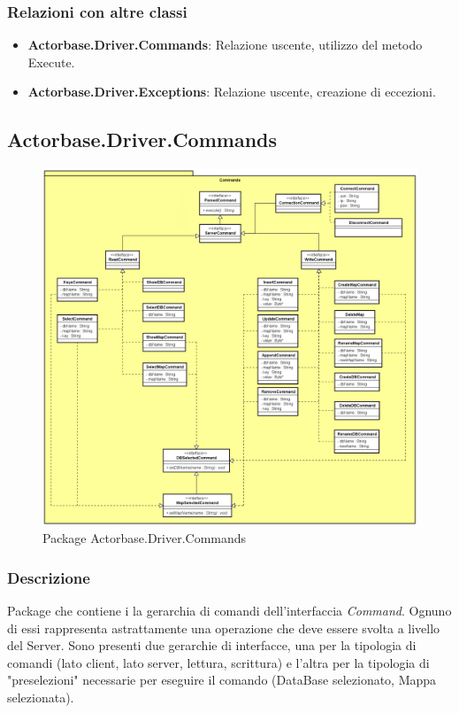 \documentclass[a4paper]{article}
\begin{document}
		\subsubsection{Relazioni con altre classi}
		\begin{itemize}
			\item \textbf{Actorbase.Driver.Commands}: Relazione uscente, utilizzo del metodo Execute.
			\item \textbf{Actorbase.Driver.Exceptions}: Relazione uscente, creazione di eccezioni.
		\end{itemize}
		
		
	\subsection{Actorbase.Driver.Commands}
		\begin{figure} [H]
			\centering
			\includegraphics[scale=0.40]{ST/Client/CommandsClasses.png}
        	\caption{Package Actorbase.Driver.Commands}
		\end{figure}
		\subsubsection{Descrizione}
			Package che contiene i la gerarchia di comandi dell'interfaccia \emph{Command}. Ognuno di essi rappresenta astrattamente una operazione che deve essere svolta a livello del Server. Sono presenti due gerarchie di interfacce, una per la tipologia di comandi (lato client, lato server, lettura, scrittura) e l'altra per la tipologia di "preselezioni" necessarie per eseguire il comando (DataBase selezionato, Mappa selezionata).
			
\end{document}

